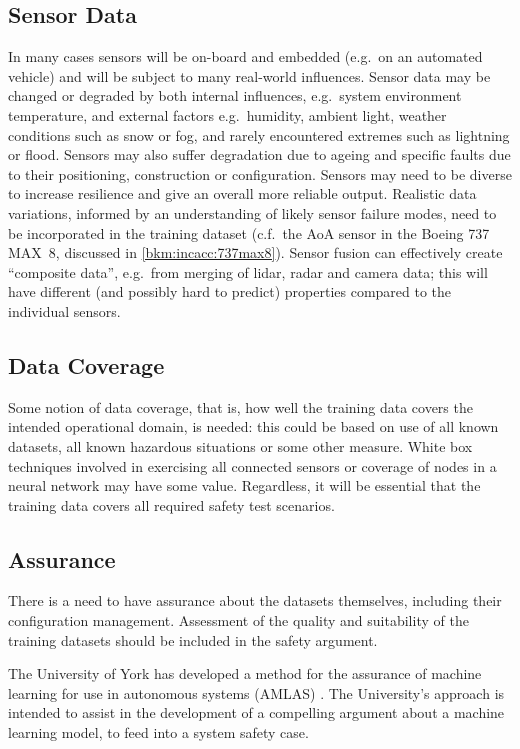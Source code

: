 \subsection{Sensor Data}
In many cases sensors will be on-board and embedded (e.g.\ on an automated vehicle) and will be subject to many real-world influences. Sensor data may be changed or degraded by both internal influences, e.g.\ system environment temperature, and external factors e.g.\ humidity, ambient light, weather conditions such as snow or fog, and rarely encountered extremes such as lightning or flood. 
Sensors may also suffer degradation due to ageing and specific faults due to their positioning, construction or configuration. Sensors may need to be diverse to increase resilience and give an overall more reliable output. Realistic data variations, informed by an understanding of likely sensor failure modes, need to be incorporated in the training \gls{dataset} (c.f.\ the AoA sensor in the Boeing 737 MAX~8, discussed in \autoref{bkm:incacc:737max8}).
Sensor fusion can effectively create ``composite data'', e.g.\ from merging of lidar, radar and camera data; this will have different (and possibly hard to predict) properties compared to the individual sensors.

\subsection{Data Coverage}
Some notion of data coverage, that is, how well the training data covers the intended operational domain, is needed: this could be based on use of all known \glspl{dataset}, all known hazardous situations or some other measure. White box techniques involved in exercising all connected sensors or coverage of nodes in a neural network may have some value. Regardless, it will be essential that the training data covers all required safety test scenarios.

\subsection{ Assurance}
There is a need to have assurance about the \glspl{dataset} themselves, including their configuration management. Assessment of the quality and suitability of the training \glspl{dataset} should be included in the safety argument.

The University of York has developed a method for the assurance of machine learning for use in autonomous systems (AMLAS)
\cite{citation:machinelearning:amlas}.
The University's approach is intended to assist in the development of a compelling argument about a machine learning model,
to feed into a system safety case.

